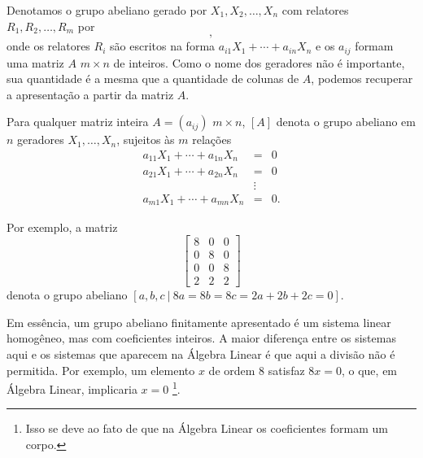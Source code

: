     	\par\vspace{0.3cm} Denotamos o grupo abeliano gerado por $X_1, X_2, \dots, X_n$ com relatores 
    	$R_1, R_2, \dots, R_m$ por 
    	\begin{equation*}
    	    [X_1, X_2, \dots, X_n \ \vert \ R_1, R_2, \dots, R_m],
    	\end{equation*}
    	onde os relatores $R_i$ são escritos na forma 
    	$a_{i1}X_1+ \cdots +a_{in}X_n$ e os $a_{ij}$ formam 
    	uma matriz $A$ $m\times n$ de inteiros. Como o nome dos geradores não é importante, sua quantidade 
    	é a mesma que a quantidade de colunas de $A$, podemos recuperar a apresentação a partir da matriz $A$.
    	
    	\par\vspace{0.3cm} Para qualquer matriz inteira $A=(a_{ij})$ $m\times n$, $[A]$ denota o grupo 
    	abeliano em $n$ geradores $X_1, \dots, X_n$, sujeitos às $m$ relações
    	\begin{equation*}
        	\begin{array}{ccc}
            	a_{11}X_1 +  \cdots  + a_{1n}X_n & = & 0 \\
            	a_{21}X_1 +  \cdots  + a_{2n}X_n & = & 0 \\
            	& \vdots &  \\
            	a_{m1}X_1 +  \cdots  + a_{mn}X_n & = & 0.
        	\end{array} 	
    	\end{equation*}
    	\begin{example}
    	Por exemplo, a matriz 
    	\[ 
    	\begin{bmatrix}
    	8 & 0 & 0 \\
    	0 & 8 & 0 \\
    	0 & 0 & 8 \\
    	2 & 2 & 2
    	\end{bmatrix}
    	\]
    	denota o grupo abeliano $[ a,b,c \ \vert \ 8a=8b=8c=2a+2b+2c=0 ]$.
    	\end{example}
    	Em essência, um grupo abeliano finitamente apresentado é um sistema linear 
    	homogêneo, mas com coeficientes inteiros. A maior diferença entre os sistemas aqui e os sistemas 
    	que aparecem na Álgebra Linear é que aqui a divisão não é permitida. Por exemplo, um elemento $x$ 
    	de ordem $8$ satisfaz $8x=0$, o que, em Álgebra Linear, implicaria $x=0$
    	\footnote{Isso se deve ao fato de que na Álgebra Linear os coeficientes formam um corpo.}. 

